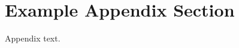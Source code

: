 \documentclass[preprint,12pt]{Definitions/elsarticle}
\begin{document}
\appendix
\section{Example Appendix Section}
\label{app1}

Appendix text.










\end{document}
